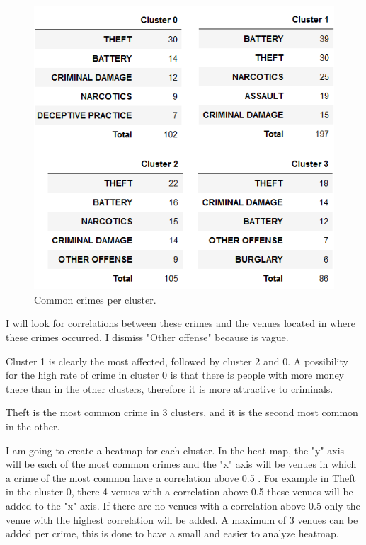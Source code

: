 \documentclass[a4paper,12pt]{article}
\begin{document}
\begin{figure}[ht]
 \centering
\includegraphics[scale=1]{common_crimes_cluster}
\caption{Common crimes per cluster. 
\label{fig:common_crimes}}
\end{figure}
I will look for correlations between these crimes and the venues located in where these crimes occurred. I dismiss "Other offense" because is vague.

Cluster 1 is clearly the most affected, followed by cluster 2 and 0. A possibility for the high rate of crime in cluster 0 is that there is people with more money there than in the other clusters, therefore it is more attractive to criminals.  

Theft is the most common crime in 3 clusters, and it is the second most common in the other.

I am going to create a heatmap for each cluster. In the heat map,  the "y" axis will be each of the most common crimes and the "x" axis will be venues in which a crime of the most common have a correlation above 0.5 . For example in Theft in the cluster 0, there 4 venues with a correlation above 0.5 these venues will be added to the "x" axis. If there are no venues with a correlation above 0.5 only the venue with the highest correlation will be added. A maximum of 3 venues can be added per crime, this is done to have a small and easier to analyze heatmap.
\end{document}
